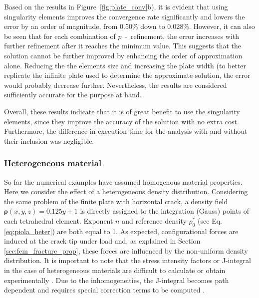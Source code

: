 \documentclass[onecolumn]{svjour3}
\begin{document}
Based on the results in Figure~\ref{fig:plate_conv}b), it is evident that using singularity elements improves the convergence rate significantly and lowers the error by an order of magnitude, from 0.50\% down to 0.028\%. 
However, it can also be seen that for each combination of $p$~-~refinement, the error increases with further refinement after it reaches the minimum value. 
This suggests that the solution cannot be further improved by enhancing the order of approximation alone. 
Reducing the the elements size and increasing the plate width (to better replicate the infinite plate used to determine the approximate solution, the error would probably decrease further. 
Nevertheless, the results are considered sufficiently accurate for the purpose at hand. 

Overall, these results indicate that it is of great benefit to use the singularity elements, since they improve the accuracy of the solution with no extra cost.
Furthermore, the difference in execution time for the analysis with and without their inclusion was negligible. 

\subsubsection{Heterogeneous material}

So far the numerical examples have assumed homogenous material properties. Here we consider the effect of a heterogeneous density distribution. 
Considering the same problem of the finite plate with horizontal crack, a density field $\mathbf{\rho}(x,y,z) = 0.125y + 1$ is directly assigned to the integration (Gauss) points of each tetrahedral element. Exponent $n$ and reference density $\rho_{0}^{\ast}$ (see Eq. \ref{eq:piola_heter}) are both equal to 1.
As expected, configurational forces are induced at the crack tip under load and, as explained in Section \ref{sec:fem_fracture_prop}, these forces are influenced by the non-uniform density distribution. 
It is important to note that the stress intensity factors or J-integral in the case of heterogeneous materials are difficult to calculate or obtain experimentally \citep{fischer_problems_2014}. Due to the inhomogeneities, the J-integral becomes path dependent and requires special correction terms to be computed \citep{eischen_fracture_1987, chang_extension_2002}. 
\end{document}
